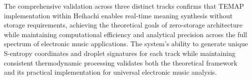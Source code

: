 The comprehensive validation across three distinct tracks confirms that TEMAP implementation within Heihachi enables real-time meaning synthesis without storage requirements, achieving the theoretical goals of zero-storage architecture while maintaining computational efficiency and analytical precision across the full spectrum of electronic music applications. The system's ability to generate unique S-entropy coordinates and droplet signatures for each track while maintaining consistent thermodynamic processing validates both the theoretical framework and its practical implementation for universal electronic music analysis.
